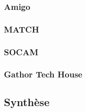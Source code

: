 \subsubsection{Amigo}
\subsubsection{MATCH}
\subsubsection{SOCAM}
\subsubsection{Gathor Tech House}
\subsection{Synthèse}
